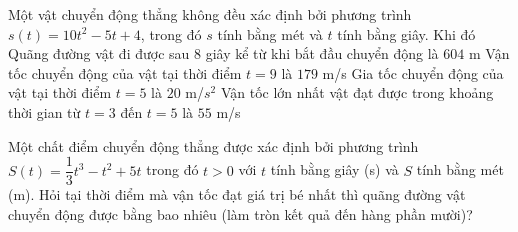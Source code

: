 \begin{ex}%

	Một vật chuyển động thẳng không đều xác định bởi phương trình $s(t)=10 t^{2} - 5 t + 4$, trong đó ${s}$ tính bằng mét và ${t}$ tính bằng giây. Khi đó
	\choiceTF
	{ \True Quãng đường vật đi được sau ${8}$ giây kể từ khi bắt đầu chuyển động là ${604}$ m}
	{ Vận tốc chuyển động của vật tại thời điểm $t=9$ là ${179}$ m/s}
	{ \True Gia tốc chuyển động của vật tại thời điểm $t=5$ là ${20}$ m/$s^2$}
	{ Vận tốc lớn nhất vật đạt được trong khoảng thời gian từ $t=3$ đến $t=5$ là $55$ m/s}
	\end{ex}

\begin{bt}%

	Một chất điểm chuyển động thẳng được xác định bởi phương trình $S\left(t\right)=\dfrac{1}{3} t^3-t^2+5t$ trong đó $t>0$ với $t$ tính bằng giây (s) và $S$ tính bằng mét (m). Hỏi tại thời điểm mà vận tốc đạt giá trị bé nhất thì quãng đường vật chuyển động được bằng bao nhiêu (làm tròn kết quả đến hàng phần mười)?
\end{bt}

